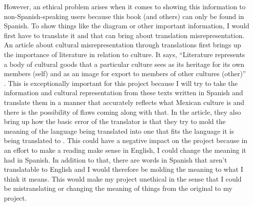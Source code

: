 \documentclass[11pt,twocolumn]{article}
\begin{document}
 However, an ethical problem arises when it comes to showing this information to non-Spanish-speaking users because this book (and others) can only be found in Spanish. To show things like the diagram or other important information, I would first have to translate it and that can bring about translation misrepresentation. An article about cultural misrepresentation through translations first brings up the importance of literature in relation to culture. It says, “Literature represents a body of cultural goods that a particular culture sees as its heritage for its own members (self) and as an image for export to members of other cultures (other)” \cite{translationmisrep2008}. This is exceptionally important for this project because I will try to take the information and cultural representation from these texts written in Spanish and translate them in a manner that accurately reflects what Mexican culture is and there is the possibility of flaws coming along with that. In the article, they also bring up how the basic error of the translator is that they try to mold the meaning of the language being translated into one that fits the language it is being translated to \cite{translationmisrep2008}. This could have a negative impact on the project because in an effort to make a reading make sense in English, I could change the meaning it had in Spanish. In addition to that, there are words in Spanish that aren’t translatable to English and I would therefore be molding the meaning to what I think it means. This would make my project unethical in the sense that I could be mistranslating or changing the meaning of things from the original to my project.  
\end{document}
